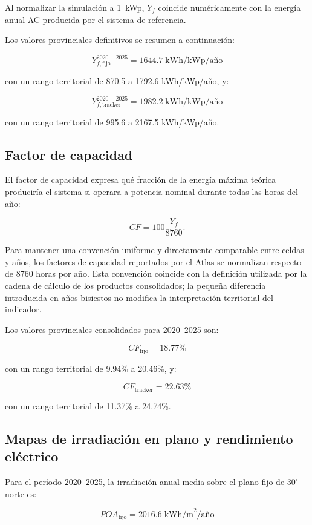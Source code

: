 \documentclass[11pt,a4paper]{article}
\begin{document}
Al normalizar la simulación a 1~kWp, $Y_f$ coincide numéricamente con la energía anual AC producida por el sistema de referencia.

Los valores provinciales definitivos se resumen a continuación:

\[
\boxed{
Y_{f,\mathrm{fijo}}^{2020-2025}
=
1644.7
\;\text{kWh/kWp/año}
}
\]

con un rango territorial de 870.5 a 1792.6 kWh/kWp/año, y:

\[
\boxed{
Y_{f,\mathrm{tracker}}^{2020-2025}
=
1982.2
\;\text{kWh/kWp/año}
}
\]

con un rango territorial de 995.6 a 2167.5 kWh/kWp/año.

\subsection{Factor de capacidad}

El factor de capacidad expresa qué fracción de la energía máxima teórica produciría el sistema si operara a potencia nominal durante todas las horas del año:

\[
CF
=
100
\frac{Y_f}{8760}.
\]

Para mantener una convención uniforme y directamente comparable entre celdas y años, los factores de capacidad reportados por el Atlas se normalizan respecto de 8760 horas por año. Esta convención coincide con la definición utilizada por la cadena de cálculo de los productos consolidados; la pequeña diferencia introducida en años bisiestos no modifica la interpretación territorial del indicador.

Los valores provinciales consolidados para 2020--2025 son:

\[
\boxed{
CF_{\mathrm{fijo}}=18.77\%
}
\]

con un rango territorial de 9.94\% a 20.46\%, y:

\[
\boxed{
CF_{\mathrm{tracker}}=22.63\%
}
\]

con un rango territorial de 11.37\% a 24.74\%.

\subsection{Mapas de irradiación en plano y rendimiento eléctrico}

Para el período 2020--2025, la irradiación anual media sobre el plano fijo de $30^\circ$ norte es:

\[
\boxed{
POA_{\mathrm{fijo}}=2016.6\;\text{kWh/m}^2\text{/año}
}
\]
\end{document}
